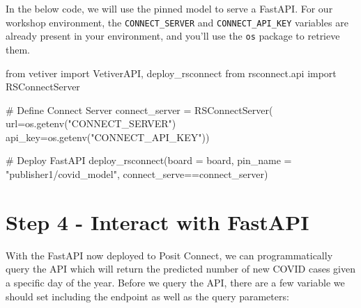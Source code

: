 \documentclass[
  letterpaper,
  DIV=11,
  numbers=noendperiod]{scrreprt}
\newenvironment{Shaded}{\begin{snugshade}}{\end{snugshade}}
\newcommand{\CommentTok}[1]{\textcolor[rgb]{0.37,0.37,0.37}{#1}}
\newcommand{\ImportTok}[1]{\textcolor[rgb]{0.00,0.46,0.62}{#1}}
\newcommand{\NormalTok}[1]{\textcolor[rgb]{0.00,0.23,0.31}{#1}}
\newcommand{\OperatorTok}[1]{\textcolor[rgb]{0.37,0.37,0.37}{#1}}
\newcommand{\StringTok}[1]{\textcolor[rgb]{0.13,0.47,0.30}{#1}}
\begin{document}
In the below code, we will use the pinned model to serve a FastAPI. For
our workshop environment, the \texttt{CONNECT\_SERVER} and
\texttt{CONNECT\_API\_KEY} variables are already present in your
environment, and you'll use the \texttt{os} package to retrieve them.

\begin{Shaded}
\begin{Highlighting}[]
\ImportTok{from}\NormalTok{ vetiver }\ImportTok{import}\NormalTok{ VetiverAPI, deploy\_rsconnect}
\ImportTok{from}\NormalTok{ rsconnect.api }\ImportTok{import}\NormalTok{ RSConnectServer}

\CommentTok{\# Define Connect Server}
\NormalTok{connect\_server }\OperatorTok{=}\NormalTok{ RSConnectServer(}
\NormalTok{    url}\OperatorTok{=}\NormalTok{os.getenv(}\StringTok{"CONNECT\_SERVER"}\NormalTok{)}
\NormalTok{    api\_key}\OperatorTok{=}\NormalTok{os.getenv(}\StringTok{"CONNECT\_API\_KEY"}\NormalTok{))}
    
\CommentTok{\# Deploy FastAPI    }
\NormalTok{deploy\_rsconnect(board }\OperatorTok{=}\NormalTok{ board, }
\NormalTok{                 pin\_name }\OperatorTok{=} \StringTok{"publisher1/covid\_model"}\NormalTok{, }
\NormalTok{                 connect\_serve}\OperatorTok{==}\NormalTok{connect\_server)}
\end{Highlighting}
\end{Shaded}

\section{Step 4 - Interact with
FastAPI}\label{step-4---interact-with-fastapi}

With the FastAPI now deployed to Posit Connect, we can programmatically
query the API which will return the predicted number of new COVID cases
given a specific day of the year. Before we query the API, there are a
few variable we should set including the endpoint as well as the query
parameters:
\end{document}
